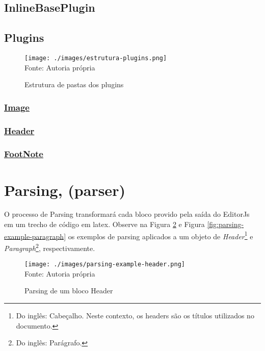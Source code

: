 \subsection{InlineBasePlugin}

\subsection{Plugins}

\begin{figure}[H]
    \centering
    \caption{Estrutura de pastas dos plugins}
    \texttt{[image: ./images/estrutura-plugins.png]}
    \label{fig:estrutura-plugins} \\
    \textnormal{\fontsize{10pt}{12pt}Fonte: Autoria própria}
\end{figure}

\subsubsection{\underline{Image}}

\subsubsection{\underline{Header}}

\subsubsection{\underline{FootNote}}

\section{Parsing, (parser)}

O processo de Parsing transformará cada bloco provido
pela saída do EditorJs em um trecho de código em
\acrshort{latex}.
Observe na
Figura \ref{fig:parsing-example-header}
e
Figura \ref{fig:parsing-example-paragraph}
os exemplos de parsing aplicados a um objeto de
\textit{Header}\footnote{Do inglês: Cabeçalho. Neste contexto, os headers são os títulos utilizados no documento.
}
e
\textit{Paragraph}\footnote{Do inglês: Parágrafo.
},
respectivamente.

\begin{figure}[H]
    \centering
    \caption{Parsing de um bloco Header}
    \texttt{[image: ./images/parsing-example-header.png]}
    \label{fig:parsing-example-header} \\
    \textnormal{\fontsize{10pt}{12pt}Fonte: Autoria própria}
\end{figure}

